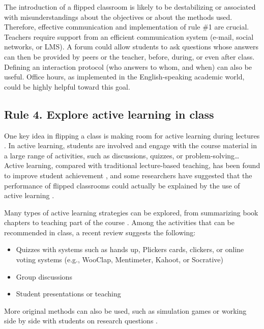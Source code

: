 \documentclass[10pt,letterpaper]{article}
\begin{document}
The introduction of a flipped classroom is likely to be destabilizing or associated with misunderstandings about the objectives or about the methods used. Therefore, effective communication \cite{lo_critical_2017} and implementation of rule \#1 are crucial. 
Teachers require support from an efficient communication system (e-mail, social networks, or LMS). 
A forum could allow students to ask questions whose answers can then be provided by peers  or the teacher, before, during, or even after class. Defining an interaction protocol (who answers to whom, and when) can also be useful. 
Office hours, as implemented in the English-speaking academic world, could be highly helpful toward this goal.


\subsection{Rule 4. Explore active learning in class}

One key idea in flipping a class is making room for active learning during lectures \cite{delozier_flipped_2017}.
In active learning, students are involved and engage with the course material in a large range of activities, such as discussions, quizzes, or problem-solving\ldots{} 
Active learning, compared with traditional lecture-based teaching, has been found to improve student achievement \cite{freeman_reply_2014}, and some researchers have suggested that the performance of flipped classrooms 
could actually be explained by the use of active learning \cite{jensen_improvements_2015}.

Many types of active learning strategies can be explored, from summarizing book chapters to teaching part of the course \cite{fiorella_eight_2016}. Among the activities that can be recommended in class, a recent review \cite{delozier_flipped_2017} suggests the following:

\begin{itemize}

\item Quizzes with systems such as hands up, Plickers cards, clickers, 
or online voting systems (e.g., WooClap, Mentimeter, Kahoot, or Socrative)

\item Group discussions

\item Student presentations or teaching

\end{itemize}


More original methods can also be used, such as simulation games \cite{taly2019molecular} or working side by side 
with students on research questions \cite{mazzanti2017can}. 
\end{document}

